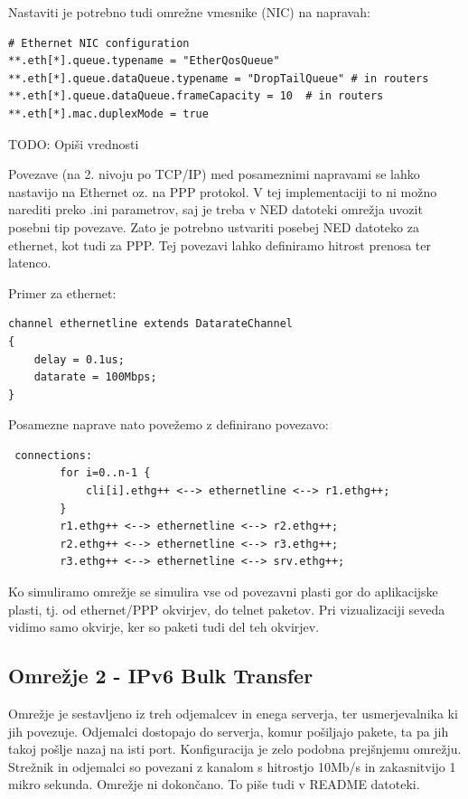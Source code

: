 \documentclass[11pt,a4paper,slovene]{myarticle}
\begin{document}
Nastaviti je potrebno tudi omrežne vmesnike (NIC) na napravah:
\begin{lstlisting}
# Ethernet NIC configuration
**.eth[*].queue.typename = "EtherQosQueue"
**.eth[*].queue.dataQueue.typename = "DropTailQueue" # in routers
**.eth[*].queue.dataQueue.frameCapacity = 10  # in routers
**.eth[*].mac.duplexMode = true
\end{lstlisting}

TODO: Opiši vrednosti

Povezave (na 2. nivoju po TCP/IP) med posameznimi napravami se lahko nastavijo na Ethernet oz. na PPP protokol.
V tej implementaciji to ni možno narediti preko .ini parametrov, saj je treba v NED datoteki omrežja uvozit posebni tip povezave. Zato je potrebno ustvariti posebej NED datoteko za ethernet, kot tudi za PPP.
Tej povezavi lahko definiramo hitrost prenosa ter latenco.

Primer za ethernet:
\begin{lstlisting}
channel ethernetline extends DatarateChannel
{
    delay = 0.1us;
    datarate = 100Mbps;
}
\end{lstlisting}

Posamezne naprave nato povežemo z definirano povezavo:
\begin{lstlisting}
 connections:
        for i=0..n-1 {
            cli[i].ethg++ <--> ethernetline <--> r1.ethg++;
        }
        r1.ethg++ <--> ethernetline <--> r2.ethg++;
        r2.ethg++ <--> ethernetline <--> r3.ethg++;
        r3.ethg++ <--> ethernetline <--> srv.ethg++;
\end{lstlisting}

Ko simuliramo omrežje se simulira vse od povezavni plasti gor do aplikacijske plasti, tj. od ethernet/PPP okvirjev, do telnet paketov. Pri vizualizaciji seveda vidimo samo okvirje, ker so paketi tudi del teh okvirjev.




\subsection{Omrežje 2 - IPv6 Bulk Transfer}
Omrežje je sestavljeno iz treh odjemalcev in enega serverja, ter usmerjevalnika ki jih povezuje. Odjemalci dostopajo do serverja, komur pošiljajo pakete, ta pa jih takoj pošlje nazaj na isti port. Konfiguracija je zelo podobna prejšnjemu omrežju.
Strežnik in odjemalci so povezani z kanalom s hitrostjo 10Mb/s in zakasnitvijo 1 mikro sekunda. Omrežje ni dokončano. To piše tudi v README datoteki.
\end{document}
